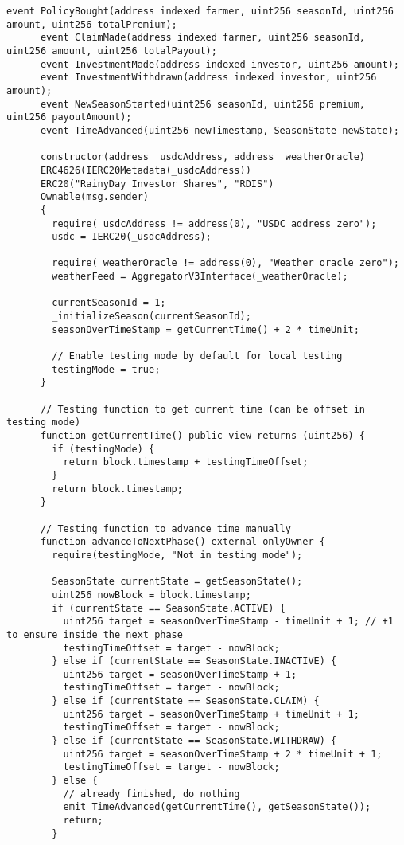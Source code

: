 \begin{lstlisting}[style=soliditystyle, caption={RainyDayFund.sol - Main Insurance Contract},label={lst:lstlistingA}]
      event PolicyBought(address indexed farmer, uint256 seasonId, uint256 amount, uint256 totalPremium);
      event ClaimMade(address indexed farmer, uint256 seasonId, uint256 amount, uint256 totalPayout);
      event InvestmentMade(address indexed investor, uint256 amount);
      event InvestmentWithdrawn(address indexed investor, uint256 amount);
      event NewSeasonStarted(uint256 seasonId, uint256 premium, uint256 payoutAmount);
      event TimeAdvanced(uint256 newTimestamp, SeasonState newState);

      constructor(address _usdcAddress, address _weatherOracle)
      ERC4626(IERC20Metadata(_usdcAddress))
      ERC20("RainyDay Investor Shares", "RDIS")
      Ownable(msg.sender)
      {
        require(_usdcAddress != address(0), "USDC address zero");
        usdc = IERC20(_usdcAddress);

        require(_weatherOracle != address(0), "Weather oracle zero");
        weatherFeed = AggregatorV3Interface(_weatherOracle);

        currentSeasonId = 1;
        _initializeSeason(currentSeasonId);
        seasonOverTimeStamp = getCurrentTime() + 2 * timeUnit;

        // Enable testing mode by default for local testing
        testingMode = true;
      }

      // Testing function to get current time (can be offset in testing mode)
      function getCurrentTime() public view returns (uint256) {
        if (testingMode) {
          return block.timestamp + testingTimeOffset;
        }
        return block.timestamp;
      }

      // Testing function to advance time manually
      function advanceToNextPhase() external onlyOwner {
        require(testingMode, "Not in testing mode");

        SeasonState currentState = getSeasonState();
        uint256 nowBlock = block.timestamp;
        if (currentState == SeasonState.ACTIVE) {
          uint256 target = seasonOverTimeStamp - timeUnit + 1; // +1 to ensure inside the next phase
          testingTimeOffset = target - nowBlock;
        } else if (currentState == SeasonState.INACTIVE) {
          uint256 target = seasonOverTimeStamp + 1;
          testingTimeOffset = target - nowBlock;
        } else if (currentState == SeasonState.CLAIM) {
          uint256 target = seasonOverTimeStamp + timeUnit + 1;
          testingTimeOffset = target - nowBlock;
        } else if (currentState == SeasonState.WITHDRAW) {
          uint256 target = seasonOverTimeStamp + 2 * timeUnit + 1;
          testingTimeOffset = target - nowBlock;
        } else {
          // already finished, do nothing
          emit TimeAdvanced(getCurrentTime(), getSeasonState());
          return;
        }


\end{lstlisting}
